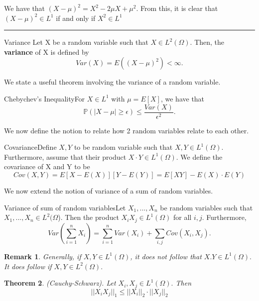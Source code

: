 \documentclass[twoside]{article}
\newcounter{lecnum}
\newtheorem{theorem}{Theorem}[lecnum]
\newtheorem{remark}[theorem]{Remark}
\newenvironment{proof}{{\bf Proof:}}{\hfill\rule{2mm}{2mm}}
\newcommand{\prob}{\mathbb{P}}
\begin{document}
\begin{proof} We have that $(X - \mu)^2 = X^2 - 2\mu X + \mu^2$. From this, it is clear that $(X - \mu)^2 \in L^1$ if and only if $X^2 \in L^1$ 
\end{proof}

\begin{definition_exam}{Variance}{} Let X be a random variable such that $X \in L^2(\Omega)$.
Then, the \textbf{variance} of X is defined by 
$$
Var(X) = E((X - \mu)^2) < \infty.
$$
\end{definition_exam}

We state a useful theorem involving the variance of a random variable.

\begin{theorem_exam}{Chebychev's Inequality}{}For $X \in L^1$ with $\mu = E[X]$, we have that 
$$
\prob(|X - \mu| \geq \epsilon) \leq \frac{Var(X)}{\epsilon^2}.
$$
\end{theorem_exam}

We now define the notion to relate how 2 random variables relate to each other.

\begin{definition_exam}{Covariance}{}Define $X,Y$ to be random variable such that $X, Y \in L^1(\Omega).$ Furthermore, assume that their product $X \cdot Y \in L^1(\Omega).$ We define the covariance of X and Y to be 
$$
Cov(X,Y) = E[X - E(X)][Y - E(Y)] = E[XY] - E(X)\cdot E(Y)
$$
\end{definition_exam}

We now extend the notion of variance of a sum of random variables.

\begin{proposition_exam}{Variance of sum of random variables}{}Let $X_1,...,X_n$ be random variables such that $X_1,...,X_n \in L^2(\Omega$). Then the product $X_iX_j \in L^1(\Omega)$ for all $i,j.$ Furthermore, 
$$
Var(\sum_{i=1}^{n}X_i) = \sum_{i=1}^{n}Var(X_i) + \sum_{i,j}Cov(X_i, X_j).
$$
\end{proposition_exam}

\begin{remark}Generally, if $X, Y \in L^1(\Omega)$, it does not follow that $X.Y \in L^1(\Omega).$ It does follow if $X, Y \in L^2(\Omega).$
\end{remark}

\begin{theorem}(Cauchy-Schwarz). Let $X_i, X_j \in L^1(\Omega).$ Then 
$$
||X_iX_j||_1 \leq ||X_i||_2 \cdot ||X_j||_2
$$
\end{theorem}
\end{document}
